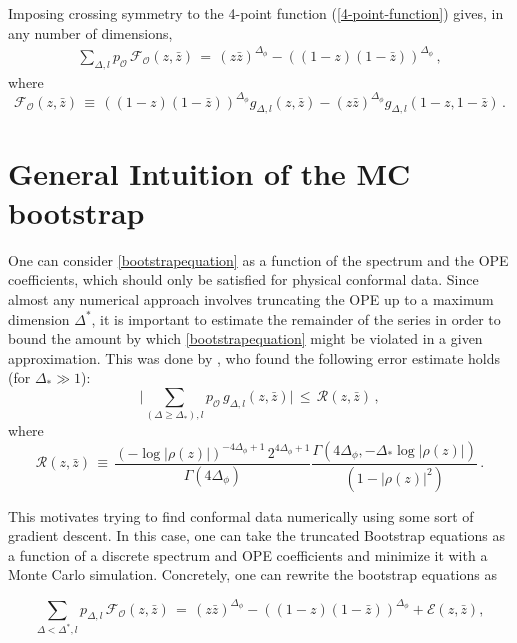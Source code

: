\documentclass[letterpaper]{article}
\numberwithin{equation}{section}
\begin{document}
Imposing crossing symmetry to the 4-point function (\ref{4-point-function}) gives, in any number of dimensions, 
\begin{align}
\label{bootstrapequation}
\sum_{\Delta ,l } p_{\mathcal{O}} \, \mathcal{F}_{\mathcal{O}}(z, \bar z) \, = \, (z \bar z)^{\Delta_\phi} - ((1-z)(1-\bar z))^{\Delta_\phi} \, ,
\end{align} 
where
\begin{equation}
\mathcal{F}_{\mathcal{O}}(z, \bar z) \, \equiv \, ((1-z)(1-\bar z))^{\Delta_\phi} g_{\Delta,l}(z,\bar z)- (z \bar z)^{\Delta_\phi} g_{\Delta,l}(1-z,1-\bar z) \,.
\end{equation}


\section{General Intuition of the MC bootstrap}
One can consider \ref{bootstrapequation} as a function of the spectrum and the
OPE coefficients, which should only be satisfied for physical conformal data.
Since almost any numerical approach involves truncating the OPE up to a maximum
dimension $\Delta^*$, it is important to estimate the remainder of the series in
order to bound the amount by which \ref{bootstrapequation} might be violated in
a given approximation. This was done by \cite{Pappadopulo:2012jk},
who found the following error estimate holds (for $\Delta_*\gg 1$):
\begin{equation}
\Big|\sum_{(\Delta\geq \Delta_*),l}p_{\mathcal{O}} \, g_{\Delta,l}(z,\bar z)\Big| \, \leq \, \mathcal{R}(z,\bar z)\,,
\label{finalest4}
\end{equation}
where
\begin{equation}
\mathcal{R}(z,\bar z) \,\equiv \, \frac{(-\log|\rho(z)|)^{-4\Delta_\phi+1} \, 2^{4\Delta_\phi+1}}{\Gamma(4\Delta_\phi)} \frac{\Gamma(4\Delta_\phi, - \Delta_* \log |\rho(z)|)}{{(1-|\rho(z)|^2)}}\,.
\label{finalest5a}
\end{equation}

This motivates trying to find conformal data numerically using some sort of
gradient descent. In this case, one can take the truncated 
Bootstrap equations as a function of a discrete spectrum and OPE coefficients 
and minimize it with a Monte Carlo
simulation. Concretely, one can rewrite the bootstrap equations as 

\begin{equation}
\label{bootstrapequation-bound}
\sum_{\Delta<\Delta^* ,l } p_{\mathcal{\Delta},l} \,
  \mathcal{F}_{\mathcal{O}}(z, \bar z) \, = \, (z \bar z)^{\Delta_\phi} -
  ((1-z)(1-\bar z))^{\Delta_\phi} + \mathcal{E}(z,\bar z),
\end{equation} 
\end{document}

